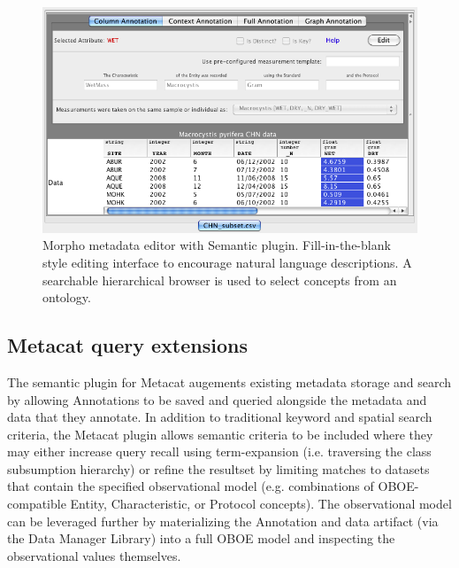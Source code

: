 \begin{figure}
\centering
\includegraphics[width=1.0\textwidth]{images/morpho-annotation.png}
\caption{Morpho metadata editor with Semantic plugin. Fill-in-the-blank style editing interface to encourage natural language descriptions. A searchable hierarchical browser is used to select concepts from an ontology.}
\label{fig:morpho-annotation}
\end{figure}

\subsection{Metacat query extensions}
The semantic plugin for Metacat augements existing metadata storage and search by allowing Annotations to be saved and queried alongside the metadata and data that they annotate. In addition to traditional keyword and spatial search criteria, the Metacat plugin allows semantic criteria to be included where they may either increase query recall using term-expansion (i.e. traversing the class subsumption hierarchy) or refine the resultset by limiting matches to datasets that contain the specified observational model (e.g. combinations of OBOE-compatible Entity, Characteristic, or Protocol concepts). The observational model can be leveraged further by materializing the Annotation and data artifact (via the Data Manager Library) into a full OBOE model and inspecting the observational values themselves. 

